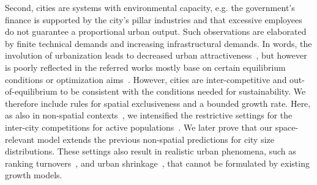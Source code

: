 \documentclass[reprint,unsortedaddress,amsmath,amssymb,aps,prl,showkeys]{revtex4-2}
\begin{document}
Second, cities are systems with environmental capacity, e.g. the government's finance is supported by the city's pillar industries and that excessive employees do not guarantee a proportional urban output. Such observations are elaborated by finite technical demands and increasing infrastructural demands. In words, the involution of urbanization leads to decreased urban attractiveness~\cite{atkinson2012urban, girardin2009quantifying,gomez2018explaining,parris2003characterizing,batty2008size}, but however is poorly reflected in the referred works mostly base on certain equilibrium conditions or optimization aims~\cite{zipf1949human}. However, cities are inter-competitive and out-of-equilibrium to be consistent with the conditions needed for sustainability\cite{fujita1976spatial,louf2014congestion,ccolak2016understanding}. We therefore include rules for spatial exclusiveness and a bounded growth rate. Here, as also in non-spatial contexts~\cite{PhysRevE.55.R3817}, we intensified the restrictive settings for the inter-city competitions for active populations~\cite{batty2017urban}. We later prove that our space-relevant model extends the previous non-spatial predictions for city size distributions. These settings also result in realistic urban phenomena, such as ranking turnovers~\cite{gabaix2004evolution}, and urban shrinkage~\cite{haase2014conceptualizing}, that cannot be formulated by existing growth models.
\end{document}
